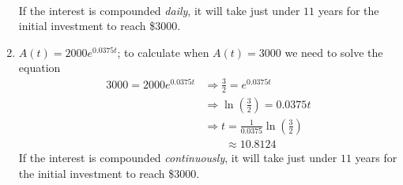 \begin{pccexample}
\begin{pccsolution}
\begin{enumerate}
\begin{align*}
			\end{align*}
			If the interest is compounded \emph{daily}, it will take just under $11$ years for the 
			initial investment to reach \$3000.
			\item $A(t)=2000e^{0.0375t}$; to calculate when $A(t)=3000$ we need to solve the 
			equation
			\begin{align*}
				3000=2000e^{0.0375t} & \Rightarrow \frac{3}{2}=e^{0.0375t}                           \\
				                     & \Rightarrow \ln\left( \frac{3}{2} \right)=0.0375t             \\
				                     & \Rightarrow t = \frac{1}{0.0375}\ln\left( \frac{3}{2} \right) \\
				                     & \phantom{ {}\Rightarrow t}\approx 10.8124                     
			\end{align*}
			If the interest is compounded \emph{continuously}, it will take just under $11$ years for the 
			initial investment to reach \$3000.
		\end{enumerate}
	\end{pccsolution}
\end{pccexample}

